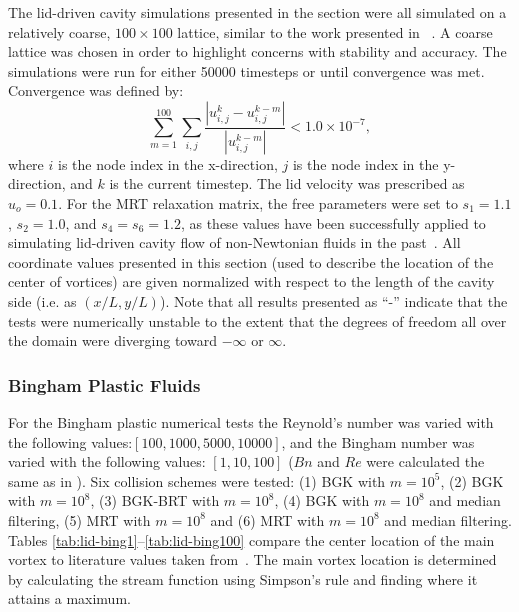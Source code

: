 The lid-driven cavity simulations presented in the section were all simulated on a relatively coarse, $100 \times 100$ lattice, similar to the work presented in ~\cite{brownlee2008nonequilibrium}.
A coarse lattice was chosen in order to highlight concerns with stability and accuracy.
The simulations were run for either 50000 timesteps or until convergence was met.
Convergence was defined by:
\begin{equation} \label{eq:convergence}
\sum_{m=1}^{100} \sum_{i, j} \frac{|u_{i, j}^k - u_{i, j}^{k-m}|}{|u_{i, j}^{k-m}|} < 1.0 \times 10^{-7},
\end{equation}
\noindent where $i$ is the node index in the x-direction, $j$ is the node index in the y-direction, and $k$ is the current timestep.
The lid velocity was prescribed as $u_o = 0.1$.
For the MRT relaxation matrix, the free parameters were set to $s_1 = 1.1$, $s_2 = 1.0$, and $s_4 = s_6 = 1.2$, as these values have been successfully applied to simulating lid-driven cavity flow of non-Newtonian fluids in the past~\cite{chen2014simulations,li2014simulation}.
All coordinate values presented in this section (used to describe the location of the center of vortices) are given normalized with respect to the length of the cavity side (i.e. as $(x / L, y / L)$).
Note that all results presented as ``-'' indicate that the tests were numerically unstable to the extent that the degrees of freedom all over the domain were diverging toward $-\infty$ or $\infty$.

\subsubsection{Bingham Plastic Fluids}

For the Bingham plastic numerical tests the Reynold's number was varied with the following values:$[100, 1000, 5000, 10000]$, and the Bingham number was varied with the following values: $[1, 10, 100]$ ($Bn$ and $Re$ were calculated the same as in ).
Six collision schemes were tested: (1) BGK with $m = 10^5$, (2) BGK with $m = 10^8$, (3) BGK-BRT with $m = 10^8$, (4) BGK with $m = 10^8$ and median filtering, (5) MRT with $m = 10^8$ and (6) MRT with $m = 10^8$ and median filtering.
Tables \ref{tab:lid-bing1}--\ref{tab:lid-bing100} compare the center location of the main vortex to literature values taken from~\citet{syrakos2014performance}.
The main vortex location is determined by calculating the stream function using Simpson's rule and finding where it attains a maximum.

